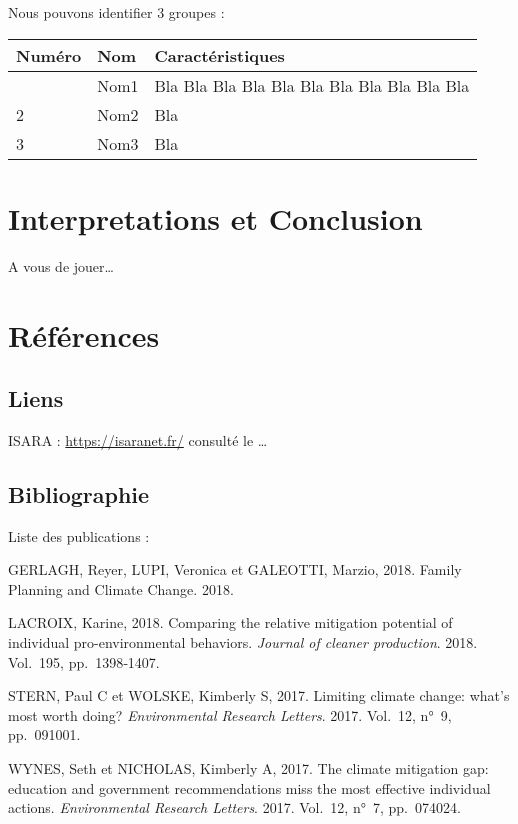 \documentclass[
]{article}
\newlength{\cslhangindent}
\newenvironment{CSLReferences}[2] %
 {\begin{list}{}{%
  \setlength{\itemindent}{0pt}
  \setlength{\leftmargin}{0pt}
  \setlength{\parsep}{0pt}
  \ifodd #1
   \setlength{\leftmargin}{\cslhangindent}
   \setlength{\itemindent}{-1\cslhangindent}
  \fi
  \setlength{\itemsep}{#2\baselineskip}}}
 {\end{list}}
\begin{document}
Nous pouvons identifier 3 groupes :

\begin{longtable}[]{@{}lll@{}}
\toprule\noalign{}
Numéro & Nom & Caractéristiques \\
\midrule\noalign{}
\endhead
\bottomrule\noalign{}
\endlastfoot
1 & Nom1 & Bla Bla Bla Bla Bla Bla Bla Bla Bla Bla Bla \\
2 & Nom2 & Bla \\
3 & Nom3 & Bla \\
\end{longtable}

\section{Interpretations et
Conclusion}\label{interpretations-et-conclusion}

A vous de jouer\ldots{}

\section{Références}\label{ruxe9fuxe9rences}

\subsection{Liens}\label{liens}

ISARA : \url{https://isaranet.fr/} consulté le \ldots{}

\subsection{Bibliographie}\label{bibliographie}

Liste des publications :

\label{refs}
\begin{CSLReferences}{0}{1}
GERLAGH, Reyer, LUPI, Veronica et GALEOTTI, Marzio, 2018. Family
Planning and Climate Change. 2018.

LACROIX, Karine, 2018. Comparing the relative mitigation potential of
individual pro-environmental behaviors. \emph{Journal of cleaner
production}. 2018. Vol.~195, pp.~1398‑1407.

STERN, Paul C et WOLSKE, Kimberly S, 2017. Limiting climate change:
what's most worth doing? \emph{Environmental Research Letters}. 2017.
Vol.~12, n°~9, pp.~091001.

WYNES, Seth et NICHOLAS, Kimberly A, 2017. The climate mitigation gap:
education and government recommendations miss the most effective
individual actions. \emph{Environmental Research Letters}. 2017.
Vol.~12, n°~7, pp.~074024.

\end{CSLReferences}
\end{document}
